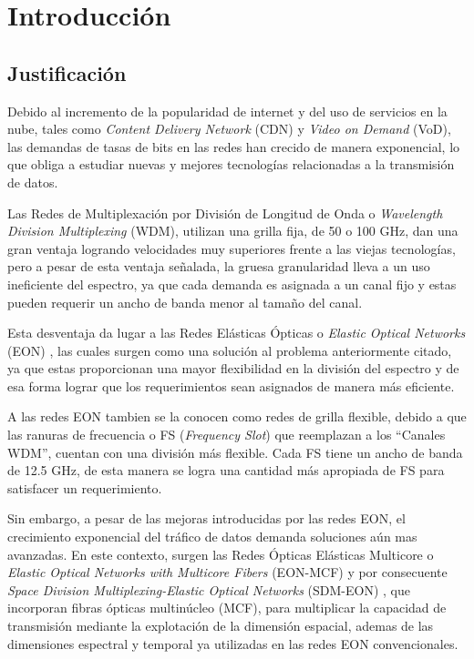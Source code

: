 \chapter{Introducción}
\section{Justificación}

Debido al incremento de la popularidad de internet y del uso de servicios en la nube, tales como \textit{Content Delivery Network} (CDN) y \textit{Video on Demand} (VoD), las demandas de  tasas de bits en las redes han crecido de manera exponencial, lo que obliga a estudiar nuevas y mejores tecnologías relacionadas a la transmisión de datos.

Las  Redes de Multiplexación por División de Longitud de Onda o \textit{Wavelength Division Multiplexing} (WDM), utilizan una grilla fija, de 50 o 100 GHz, dan una gran ventaja logrando velocidades muy superiores
frente a las viejas tecnologías, pero a pesar de esta ventaja señalada, la gruesa granularidad lleva a un
uso ineficiente del espectro, ya que cada demanda es asignada a un canal fijo y estas pueden requerir un
ancho de banda menor al tamaño del canal.

Esta desventaja da lugar a las Redes Elásticas Ópticas o \textit{Elastic Optical Networks} (EON) \cite{jinno2009spectrum}, las cuales surgen como una solución al problema anteriormente citado, ya que estas proporcionan una mayor flexibilidad en la división del espectro y de esa forma lograr que los requerimientos sean asignados de manera más eficiente.

A las redes EON tambien se la conocen como redes de grilla flexible, debido a que las ranuras de frecuencia o FS (\textit{Frequency Slot}) que reemplazan a los ``Canales WDM'', cuentan con una división más flexible. Cada FS tiene un ancho de banda de 12.5 GHz, de esta manera se logra una cantidad más apropiada de FS para satisfacer un requerimiento.
%

Sin embargo, a pesar de las mejoras introducidas por las redes EON, el crecimiento exponencial del tráfico de datos demanda soluciones aún mas avanzadas. En este contexto, surgen las Redes Ópticas Elásticas Multicore o \textit{Elastic Optical Networks with Multicore Fibers} (EON-MCF) y por consecuente \textit{Space Division Multiplexing-Elastic Optical Networks} (SDM-EON) , que incorporan fibras ópticas multinúcleo (MCF), para multiplicar la capacidad de transmisión mediante la explotación de la dimensión espacial, ademas de las dimensiones espectral y temporal ya utilizadas en las redes EON convencionales.
%

